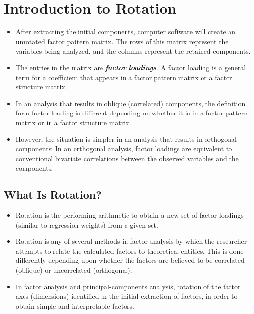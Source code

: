 \documentclass[a4paper,12pt]{article}
\begin{document}
	
	\tableofcontents
	\newpage

\section{Introduction to Rotation}

\begin{itemize}
	\item After extracting the initial components, computer software
	will create an unrotated factor pattern matrix. The rows of this matrix represent the variables
	being analyzed, and the columns represent the retained components.
	
\item	The entries in the matrix are \textbf{\emph{factor loadings}}. A factor loading is a general term for a coefficient
	that appears in a factor pattern matrix or a factor structure matrix. 

\item In an analysis that results in
	oblique (correlated) components, the definition for a factor loading is different depending on
	whether it is in a factor pattern matrix or in a factor structure matrix.
	
\item 	However, the situation is simpler in an analysis that results in orthogonal components: In an
	orthogonal analysis, factor loadings are equivalent to conventional bivariate correlations between the observed
	variables and the components.
\end{itemize}

	\subsection{What Is Rotation?}
\begin{itemize}
	\item 	Rotation is the performing arithmetic to obtain a new set of factor loadings (similar to regression weights) from a given set.
	
\item 	Rotation is any of several methods in factor analysis by which the researcher attempts to relate the calculated factors to theoretical entities. This is done differently depending upon whether the factors are believed to be correlated (oblique) or uncorrelated
	(orthogonal).
\item  In factor analysis and principal-components analysis, rotation of the factor axes
	(dimensions) identified in the initial extraction of factors, in order to obtain simple and interpretable
	factors.
	
\end{itemize}
\end{document}
